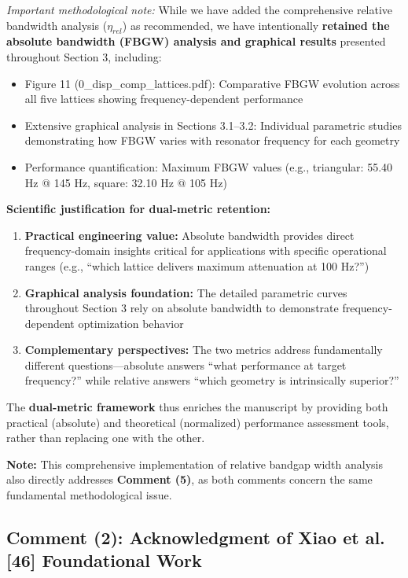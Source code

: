 \documentclass[11pt,a4paper]{article}
\newenvironment{changesbox}{%
    \par\medskip\noindent{\color{changescolor}\rule{\linewidth}{2pt}}\par
    \noindent{\color{changescolor}\bfseries Manuscript Changes}\par\smallskip
}{%
    \par\noindent{\color{changescolor}\rule{\linewidth}{0.5pt}}\medskip
}
\begin{document}
\begin{changesbox}
\textit{Important methodological note:} While we have added the comprehensive relative bandwidth analysis ($\eta_{rel}$) as recommended, we have intentionally \textbf{retained the absolute bandwidth (FBGW) analysis and graphical results} presented throughout Section 3, including:
\begin{itemize}
    \item Figure 11 (0\_disp\_comp\_lattices.pdf): Comparative FBGW evolution across all five lattices showing frequency-dependent performance
    \item Extensive graphical analysis in Sections 3.1--3.2: Individual parametric studies demonstrating how FBGW varies with resonator frequency for each geometry
    \item Performance quantification: Maximum FBGW values (e.g., triangular: 55.40 Hz @ 145 Hz, square: 32.10 Hz @ 105 Hz)
\end{itemize}

\textbf{Scientific justification for dual-metric retention:}
\begin{enumerate}
    \item \textbf{Practical engineering value:} Absolute bandwidth provides direct frequency-domain insights critical for applications with specific operational ranges (e.g., ``which lattice delivers maximum attenuation at 100 Hz?'')
    \item \textbf{Graphical analysis foundation:} The detailed parametric curves throughout Section 3 rely on absolute bandwidth to demonstrate frequency-dependent optimization behavior
    \item \textbf{Complementary perspectives:} The two metrics address fundamentally different questions—absolute answers ``what performance at target frequency?'' while relative answers ``which geometry is intrinsically superior?''
\end{enumerate}

The \textbf{dual-metric framework} thus enriches the manuscript by providing both practical (absolute) and theoretical (normalized) performance assessment tools, rather than replacing one with the other.
\end{changesbox}

\textbf{Note:} This comprehensive implementation of relative bandgap width analysis also directly addresses \textbf{Comment (5)}, as both comments concern the same fundamental methodological issue.

\newpage

\subsection*{Comment (2): Acknowledgment of Xiao et al. [46] Foundational Work}
\end{document}
